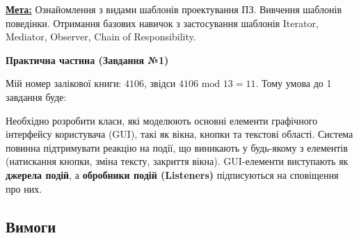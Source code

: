 \documentclass[12pt,a4paper]{article}
\begin{document}
    \vspace{1em}

    \textbf{\underline{Мета:}} Ознайомлення з видами шаблонів проектування ПЗ. Вивчення шаблонів
    поведінки. Отримання базових навичок з застосування шаблонів Iterator, Mediator, Observer,
    Chain of Responsibility.

    \begin{center} \textbf{\Large Практична частина (Завдання №1)} \end{center}

    \setlength{\parindent}{1.5em}

    Мій номер залікової книги: $4106$, звідси $4106 \text{ mod } 13 = 11$. Тому умова до 1 завдання буде:

    Необхідно розробити класи, які моделюють основні елементи графічного інтерфейсу користувача (GUI), такі як вікна, кнопки та текстові області. Система повинна підтримувати реакцію на події, що виникають у будь-якому з елементів (натискання кнопки, зміна тексту, закриття вікна). GUI-елементи виступають як \textbf{джерела подій}, а \textbf{обробники подій (Listeners)} підписуються на сповіщення про них.

    \subsection*{Вимоги}
\end{document}
